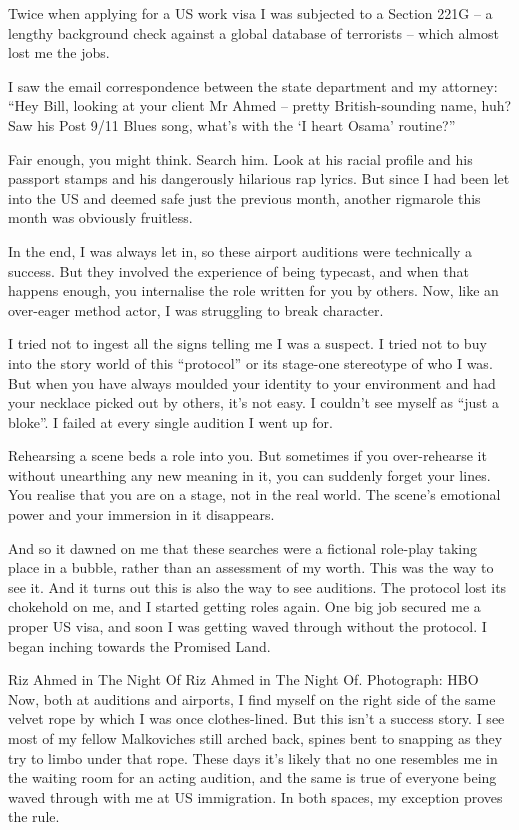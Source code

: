 \documentclass[10pt,a4paper]{article}
\begin{document}
Twice when applying for a US work visa I was subjected to a Section 221G – a lengthy background check against a global database of terrorists – which almost lost me the jobs.

I saw the email correspondence between the state department and my attorney: “Hey Bill, looking at your client Mr Ahmed – pretty British-sounding name, huh? Saw his Post 9/11 Blues song, what’s with the ‘I heart Osama’ routine?”

Fair enough, you might think. Search him. Look at his racial profile and his passport stamps and his dangerously hilarious rap lyrics. But since I had been let into the US and deemed safe just the previous month, another rigmarole this month was obviously fruitless.

In the end, I was always let in, so these airport auditions were technically a success. But they involved the experience of being typecast, and when that happens enough, you internalise the role written for you by others. Now, like an over-eager method actor, I was struggling to break character.

I tried not to ingest all the signs telling me I was a suspect. I tried not to buy into the story world of this “protocol” or its stage-one stereotype of who I was. But when you have always moulded your identity to your environment and had your necklace picked out by others, it’s not easy. I couldn’t see myself as “just a bloke”. I failed at every single audition I went up for.

Rehearsing a scene beds a role into you. But sometimes if you over-rehearse it without unearthing any new meaning in it, you can suddenly forget your lines. You realise that you are on a stage, not in the real world. The scene’s emotional power and your immersion in it disappears.

And so it dawned on me that these searches were a fictional role-play taking place in a bubble, rather than an assessment of my worth. This was the way to see it. And it turns out this is also the way to see auditions. The protocol lost its chokehold on me, and I started getting roles again. One big job secured me a proper US visa, and soon I was getting waved through without the protocol. I began inching towards the Promised Land.

Riz Ahmed in The Night Of
Riz Ahmed in The Night Of. Photograph: HBO
Now, both at auditions and airports, I find myself on the right side of the same velvet rope by which I was once clothes-lined. But this isn’t a success story. I see most of my fellow Malkoviches still arched back, spines bent to snapping as they try to limbo under that rope. These days it’s likely that no one resembles me in the waiting room for an acting audition, and the same is true of everyone being waved through with me at US immigration. In both spaces, my exception proves the rule.
\end{document}
